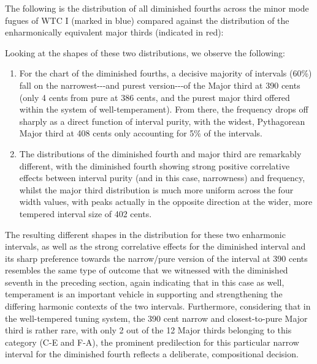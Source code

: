 The following is the distribution of all diminished fourths across the
minor mode fugues of WTC I (marked in blue) compared against the
distribution of the enharmonically equivalent major thirds (indicated in
red):


    \begin{center}
    \end{center}
    
    Looking at the shapes of these two distributions, we observe the
following:

\begin{enumerate}
\def\labelenumi{\arabic{enumi}.}
\tightlist
\item
  For the chart of the diminished fourths, a decisive majority of
  intervals (60\%) fall on the narrowest-\/-\/-and purest
  version-\/-\/-of the Major third at 390 cents (only 4 cents from pure
  at 386 cents, and the purest major third offered within the system of
  well-temperament). From there, the frequency drops off sharply as a
  direct function of interval purity, with the widest, Pythagorean Major
  third at 408 cents only accounting for 5\% of the intervals.
\item
  The distributions of the diminished fourth and major third are
  remarkably different, with the diminished fourth showing strong
  positive correlative effects between interval purity (and in this
  case, narrowness) and frequency, whilst the major third distribution
  is much more uniform across the four width values, with peaks actually
  in the opposite direction at the wider, more tempered interval size of
  402 cents.
\end{enumerate}

The resulting different shapes in the distribution for these two
enharmonic intervals, as well as the strong correlative effects for the
diminished interval and its sharp preference towards the narrow/pure
version of the interval at 390 cents resembles the same type of outcome
that we witnessed with the diminished seventh in the preceding section,
again indicating that in this case as well, temperament is an important
vehicle in supporting and strengthening the differing harmonic contexts
of the two intervals. Furthermore, considering that in the well-tempered
tuning system, the 390 cent narrow and closest-to-pure Major third is
rather rare, with only 2 out of the 12 Major thirds belonging to this
category (C-E and F-A), the prominent predilection for this particular
narrow interval for the diminished fourth reflects a deliberate,
compositional decision.

